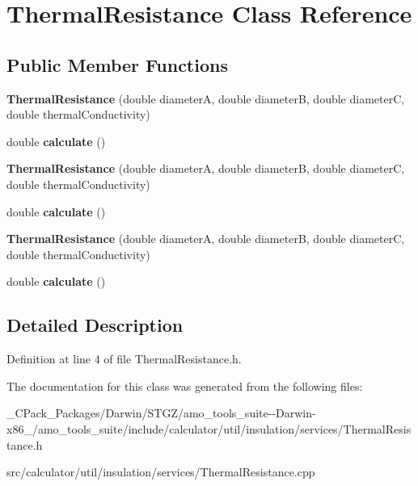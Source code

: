 \hypertarget{class_thermal_resistance}{}\section{Thermal\+Resistance Class Reference}
\label{class_thermal_resistance}
\subsection*{Public Member Functions}
\begin{DoxyCompactItemize}
\item 
\mbox{\label{class_thermal_resistance_a697d16fb621e824c7d9807cebec03145}} 
{\bfseries Thermal\+Resistance} (double diameterA, double diameterB, double diameterC, double thermal\+Conductivity)
\item 
\mbox{\label{class_thermal_resistance_a759678e9abe6dd257c21eabdfa54fc3f}} 
double {\bfseries calculate} ()
\item 
\mbox{\label{class_thermal_resistance_a697d16fb621e824c7d9807cebec03145}} 
{\bfseries Thermal\+Resistance} (double diameterA, double diameterB, double diameterC, double thermal\+Conductivity)
\item 
\mbox{\label{class_thermal_resistance_a759678e9abe6dd257c21eabdfa54fc3f}} 
double {\bfseries calculate} ()
\item 
\mbox{\label{class_thermal_resistance_a697d16fb621e824c7d9807cebec03145}} 
{\bfseries Thermal\+Resistance} (double diameterA, double diameterB, double diameterC, double thermal\+Conductivity)
\item 
\mbox{\label{class_thermal_resistance_a759678e9abe6dd257c21eabdfa54fc3f}} 
double {\bfseries calculate} ()
\end{DoxyCompactItemize}


\subsection{Detailed Description}


Definition at line 4 of file Thermal\+Resistance.\+h.



The documentation for this class was generated from the following files\+:\begin{DoxyCompactItemize}
\item 
\+\_\+\+C\+Pack\+\_\+\+Packages/\+Darwin/\+S\+T\+G\+Z/amo\+\_\+tools\+\_\+suite-\/-\/\+Darwin-\/x86\+\_/amo\+\_\+tools\+\_\+suite/include/calculator/util/insulation/services/Thermal\+Resistance.\+h\item 
src/calculator/util/insulation/services/Thermal\+Resistance.\+cpp\end{DoxyCompactItemize}
